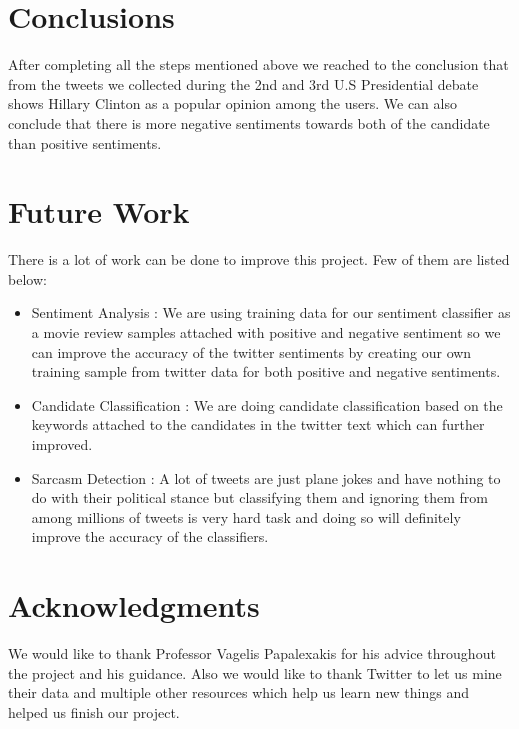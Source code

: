 \documentclass{acm_proc_article-sp}
\begin{document}
\section{Conclusions}
After completing all the steps mentioned above we reached to the conclusion that from the tweets we collected during the 2nd and 3rd U.S Presidential debate shows Hillary Clinton as a popular opinion among the users. We can also conclude that there is more negative sentiments towards both of the candidate than positive sentiments.  

\section{Future Work}
There is a lot of work can be done to improve this project. Few of them are listed below:
\begin{itemize}
	\item Sentiment Analysis : We are using training data for our sentiment classifier as a movie review samples attached with positive and negative sentiment so we can improve the accuracy of the twitter sentiments by creating our own training sample from twitter data for both positive and negative sentiments.
	\item Candidate Classification : We are doing candidate classification based on the keywords attached to the candidates in the twitter text which can further improved.
	\item Sarcasm Detection : A lot of tweets are just plane jokes and have nothing to do with their political stance but classifying them and ignoring them from among millions of tweets is very hard task and doing so will definitely improve the accuracy of the classifiers.
\end{itemize}

\section{Acknowledgments}
We would like to thank Professor Vagelis Papalexakis for his advice throughout the project and his guidance. Also we would like to thank Twitter to let us mine their data and multiple other resources which help us learn new things and helped us finish our project.\cite{ppdn:pythonprog, sklearn:skikit, tapi:twitterapi, wiki:wikipedia}

%

%
%
\appendix
\end{document}
